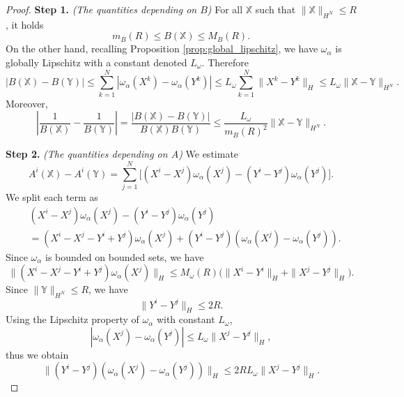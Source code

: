 \documentclass[10pt,a4paper]{amsart}
\begin{document}
\begin{proof}
\textbf{Step 1.} \textit{(The quantities depending on $B$)}  
For all $\mathds{X}$ such that $\|\mathds{X}\|_{H^N} \le R$, it holds
\begin{equation}\label{eq: B bound}
m_B(R) \le B(\mathds{X}) \le M_B(R).
\end{equation}
On the other hand, recalling Proposition \ref{prop:global_lipschitz}, we have $\omega_\alpha$ is globally Lipschitz with a constant denoted $L_\omega$. Therefore
\begin{equation*}
    |B(\mathds{X}) - B(\mathds{Y})| \le \sum_{k=1}^N |\omega_\alpha(X^k) - \omega_\alpha(Y^k)| \le L_\omega \sum_{k=1}^N \|X^k - Y^k\|_H \le L_\omega \|\mathds{X} - \mathds{Y}\|_{H^N}.
\end{equation*}
Moreover, 
\begin{equation}\label{eq: B lip}
    \left|\frac{1}{B(\mathds{X})} - \frac{1}{B(\mathds{Y})}\right| = \frac{|B(\mathds{X}) - B(\mathds{Y})|}{B(\mathds{X}) B(\mathds{Y})} \le \frac{L_\omega}{m_B(R)^2} \|\mathds{X} - \mathds{Y}\|_{H^N}.
\end{equation}

\textbf{Step 2.} \textit{(The quantities depending on $A$)} 
We estimate 
\begin{equation*}
    A^i(\mathds{X}) - A^i(\mathds{Y}) = \sum_{j=1}^N \Big[(X^i - X^j)\omega_\alpha(X^j) - (Y^i - Y^j)\omega_\alpha(Y^j)\Big].
\end{equation*}
We split each term as
\begin{equation*}
\begin{aligned}
    &(X^i - X^j)\omega_\alpha(X^j) - (Y^i - Y^j)\omega_\alpha(Y^j) \\
    & = (X^i - X^j - Y^i + Y^j)\omega_\alpha(X^j) + (Y^i - Y^j)(\omega_\alpha(X^j) - \omega_\alpha(Y^j)).
\end{aligned}
\end{equation*}
\textbullet\; Since $\omega_\alpha$ is bounded on bounded sets, we have
\begin{equation*}
    \|(X^i - X^j - Y^i + Y^j)\omega_\alpha(X^j)\|_H \le M_\omega(R)\big(\|X^i - Y^i\|_H + \|X^j - Y^j\|_H\big).
\end{equation*}
\textbullet\; Since $\|\mathds{Y}\|_{H^N} \le R$, we have
\begin{equation*}
    \|Y^i - Y^j\|_H \le 2R.
\end{equation*}
\textbullet\; Using the Lipschitz property of $\omega_\alpha$ with constant $L_\omega$,
\begin{equation*}
    |\omega_\alpha(X^j) - \omega_\alpha(Y^j)| \le L_\omega \|X^j - Y^j\|_H,
\end{equation*}
thus we obtain
\begin{equation*} 
    \|(Y^i - Y^j)(\omega_\alpha(X^j) -    \omega_\alpha(Y^j))\|_H \le 2R L_\omega \|X^j - Y^j\|_H.
\end{equation*}


\end{proof}
\end{document}
